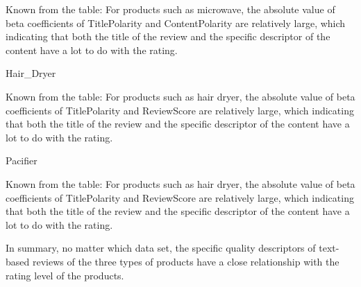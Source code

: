 \documentclass[12pt]{article}
\begin{document}
\quad\par\quad\par\quad\par\quad\par\quad\par
Known from the table: For products such as microwave, the absolute value of beta coefficients of TitlePolarity and ContentPolarity are relatively large, which indicating that both the title of the review and the specific descriptor of the content have a lot to do with the rating.
\par
Hair\_Dryer
\par
\quad\par\quad\par\quad\par\quad\par\quad\par\quad\par\quad\par\quad\par\quad\par\quad\par\quad\par\quad\par\quad\par\quad\par\quad\par\quad\par\quad\par
Known from the table: For products such as hair dryer, the absolute value of beta coefficients of TitlePolarity and ReviewScore are relatively large, which indicating that both the title of the review and the specific descriptor of the content have a lot to do with the rating.
\par
Pacifier
\par
\quad\par\quad\par\quad\par\quad\par\quad\par\quad\par\quad\par\quad\par\quad\par\quad\par\quad\par\quad\par\quad\par\quad\par\quad\par\quad\par\quad\par
Known from the table: For products such as hair dryer, the absolute value of beta coefficients of TitlePolarity and ReviewScore are relatively large, which indicating that both the title of the review and the specific descriptor of the content have a lot to do with the rating.
\par
In summary, no matter which data set, the specific quality descriptors of text-based reviews of the three types of products have a close relationship with the rating level of the products.
\end{document}
